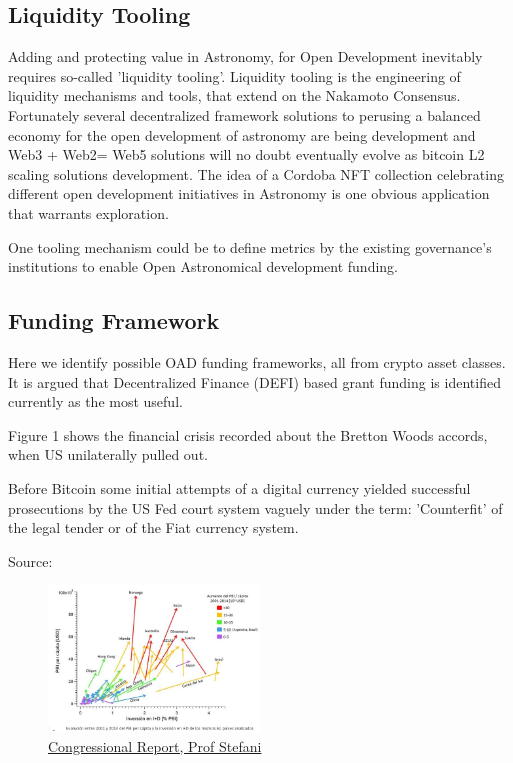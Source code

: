 \documentclass[final,5p,times,twocolumn,authoryear]{elsarticle}
\begin{document}
\subsection{Liquidity Tooling}
\label{btc2:sec:sub:liquidity}
Adding and protecting value in Astronomy, for Open Development inevitably requires so-called 'liquidity tooling'. Liquidity tooling is the engineering of liquidity mechanisms and tools, that extend on the Nakamoto Consensus. Fortunately several decentralized framework solutions to perusing a balanced economy for the open development of astronomy are being development and Web3 + Web2= Web5 solutions will no doubt eventually evolve as bitcoin L2 scaling solutions development. The idea of a Cordoba NFT collection celebrating different open development initiatives in Astronomy is one obvious application that warrants exploration. 

One tooling mechanism could be to define metrics by the existing governance's institutions to enable Open Astronomical development funding.
\subsection{Funding Framework}

Here we identify possible OAD funding frameworks, all from crypto asset classes.  It is argued that Decentralized Finance (DEFI) based grant funding is identified currently as the most useful.

Figure 1 shows the financial crisis recorded about the Bretton Woods accords, when US unilaterally pulled out.

Before Bitcoin some initial attempts of a digital currency yielded successful prosecutions by the US Fed court system vaguely under the term: 'Counterfit' of the legal tender or of the Fiat currency system. 

Source:  
 



\begin{figure}
    \centering
    \includegraphics[width=0.5\textwidth]{figs/Docuemnto_Stefani_2.jpg}
    \caption{\href{https://aargentinapciencias.org/wp-content/uploads/2019/05/Docuemnto_Stefani.pdf}{Congressional Report, Prof Stefani}}
\end{figure}
\end{document}
